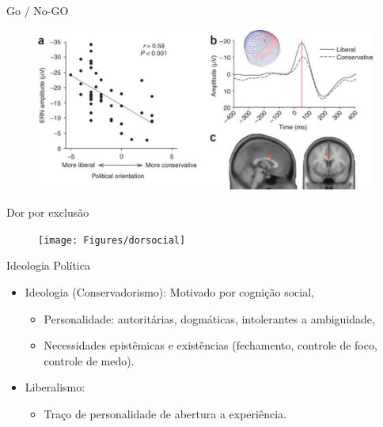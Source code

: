 \documentclass{beamer}
\begin{document}
    \begin{frame}{Go / No-GO}%
    \begin{figure}
        \includegraphics[scale=0.4]{Figures/amodio} 
        \end{figure}
    \end{frame} %

    \begin{frame}{Dor por exclusão}%
        \begin{figure}
        \begin{center}
        \texttt{[image: Figures/dorsocial]}
        \end{center}
        \end{figure}
    \end{frame}%

    \begin{frame}{Ideologia Política}
        \begin{itemize}
            \item   Ideologia (Conservadorismo): Motivado por cognição social,
                \begin{itemize}
                    \item <1-> Personalidade: autoritárias, dogmáticas,
                        intolerantes a ambiguidade,
                    \item <2-> Necessidades epistêmicas e existências
                        (fechamento, controle de foco, controle de medo).
                \end{itemize}
            \item Liberalismo:
                \begin{itemize}
                    \item <3-> Traço de personalidade de abertura a
                        experiência.
                \end{itemize}
        \end{itemize}
    \end{frame}
\end{document}
